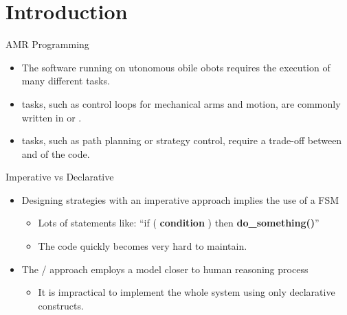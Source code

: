 \section{Introduction}

%
\begin{frame}[label=1]{AMR Programming}
  \begin{itemize}
    \item
      The software running on utonomous obile obots
      requires the execution of many different tasks.
\N\N  
    \item
       tasks, such as control loops for mechanical arms 
      and motion, are commonly written in  or 
      .
\N
\item
     tasks, such as path planning 
    or strategy control, require a trade-off between  and 
     of the code.
  \end{itemize}
\N\N
\end{frame}


\begin{frame}[label=2]{Imperative vs Declarative}
  \begin{itemize}
    \item
      Designing strategies with an imperative approach implies 
      the use of a FSM
  \begin{itemize}
\N
    \item
      Lots of statements like:
\n
      \tab \small{``if ( \textbf{condition} ) then \textbf{do\_something()}''}

\item
      The code quickly becomes very hard to maintain.
    \end{itemize}
\pause
    \N
    \item
    The / approach employs a model closer to 
    human reasoning process 
\N    
  \begin{itemize}
\item
 It is impractical to implement the whole system using only declarative constructs.

    \end{itemize}
\end{itemize}
\N\N
\end{frame}



